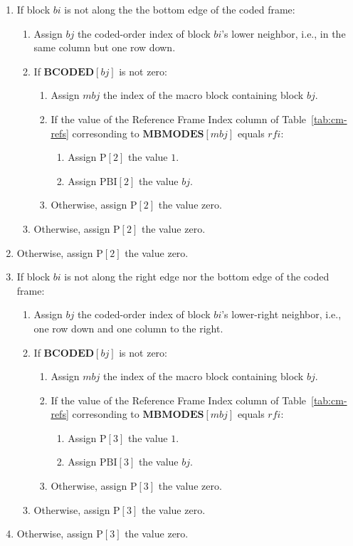 \documentclass[9pt,letterpaper]{book}
\newcommand{\idx}[1]{{\ensuremath{\mathit{#1}}}}
\newcommand{\bi}{\idx{bi}}
\newcommand{\bj}{\idx{bj}}
\newcommand{\mbj}{\idx{mbj}}
\newcommand{\rfi}{\idx{rfi}}
\newcommand{\bitvar}[1]{\ensuremath{\mathbf{\bm{#1}}}}
\newcommand{\locvar}[1]{\ensuremath{\mathrm{#1}}}
\numberwithin{equation}{chapter}
\numberwithin{figure}{chapter}
\numberwithin{table}{chapter}
\begin{document}
\begin{enumerate}
\item
If block \locvar{\bi} is not along the the bottom edge of the coded frame:
\begin{enumerate}
\item
Assign \locvar{\bj} the coded-order index of block \locvar{\bi}'s lower
 neighbor, i.e., in the same column but one row down.
\item
If $\bitvar{BCODED}[\bj]$ is not zero:
\begin{enumerate}
\item
Assign \locvar{\mbj} the index of the macro block containing block
 \locvar{\bj}.
\item
If the value of the Reference Frame Index column of Table~\ref{tab:cm-refs}
 corresonding to $\bitvar{MBMODES}[\locvar{\mbj}]$ equals \locvar{\rfi}:
\begin{enumerate}
\item
Assign $\locvar{P}[2]$ the value $1$.
\item
Assign $\locvar{PBI}[2]$ the value \locvar{\bj}.
\end{enumerate}
\item
Otherwise, assign $\locvar{P}[2]$ the value zero.
\end{enumerate}
\item
Otherwise, assign $\locvar{P}[2]$ the value zero.
\end{enumerate}
\item
Otherwise, assign $\locvar{P}[2]$ the value zero.

\item
If block \locvar{\bi} is not along the right edge nor the bottom edge of the
 coded frame:
\begin{enumerate}
\item
Assign \locvar{\bj} the coded-order index of block \locvar{\bi}'s lower-right
 neighbor, i.e., one row down and one column to the right.
\item
If $\bitvar{BCODED}[\bj]$ is not zero:
\begin{enumerate}
\item
Assign \locvar{\mbj} the index of the macro block containing block
 \locvar{\bj}.
\item
If the value of the Reference Frame Index column of Table~\ref{tab:cm-refs}
 corresonding to $\bitvar{MBMODES}[\locvar{\mbj}]$ equals \locvar{\rfi}:
\begin{enumerate}
\item
Assign $\locvar{P}[3]$ the value $1$.
\item
Assign $\locvar{PBI}[3]$ the value \locvar{\bj}.
\end{enumerate}
\item
Otherwise, assign $\locvar{P}[3]$ the value zero.
\end{enumerate}
\item
Otherwise, assign $\locvar{P}[3]$ the value zero.
\end{enumerate}
\item
Otherwise, assign $\locvar{P}[3]$ the value zero.


\end{enumerate}
\end{document}
